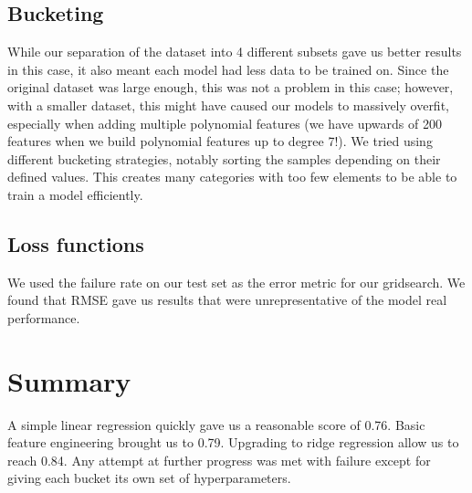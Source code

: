 \documentclass[11pt,conference,compsocconf]{IEEEtran}
\begin{document}
\subsection{Bucketing}
While our separation of the dataset into 4 different subsets gave us better results in this case, it also meant each model had less data to be trained on. Since the original dataset was large enough, this was not a problem in this case; however, with a smaller dataset, this might have caused our models to massively overfit, especially when adding multiple polynomial features (we have upwards of 200 features when we build polynomial features up to degree 7!).
We tried using different bucketing strategies, notably sorting the samples depending on their defined values. This creates many categories with too few elements to be able to train a model efficiently. 

\subsection{Loss functions}
We used the failure rate on our test set as the error metric for our gridsearch. 
We found that RMSE gave us results that were unrepresentative of the model real performance. 

\section{Summary}
A simple linear regression quickly gave us a reasonable score of 0.76. Basic feature engineering brought us to 0.79. Upgrading to ridge regression allow us to reach 0.84.
Any attempt at further progress was met with failure except for giving each bucket its own set of hyperparameters. 
\end{document}
